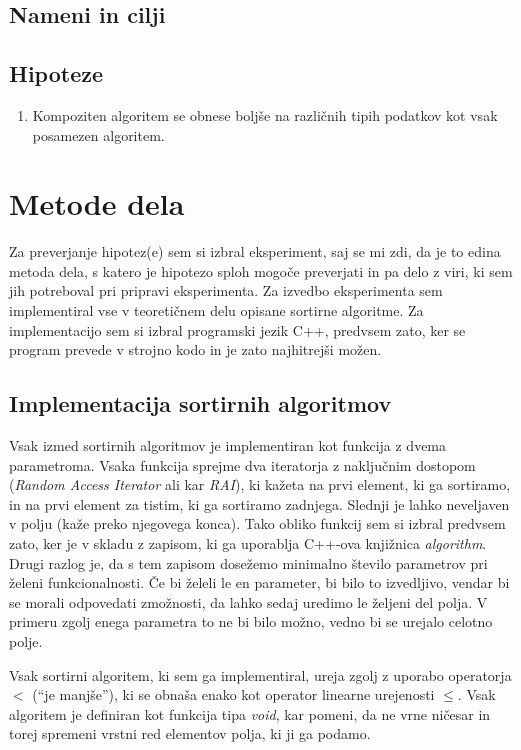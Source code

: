 \documentclass[a4paper,oneside]{article}
\begin{document}
\subsection{Nameni in cilji}
\subsection{Hipoteze}
\begin{enumerate}
  \item Kompoziten algoritem se obnese boljše na različnih tipih podatkov kot vsak
    posamezen algoritem.
\end{enumerate}
\section{Metode dela}
Za preverjanje hipotez(e) sem si izbral eksperiment, saj se mi zdi, da je to edina metoda
dela, s katero je hipotezo sploh mogoče preverjati in pa delo z viri, ki sem jih
potreboval pri pripravi eksperimenta.
Za izvedbo eksperimenta sem implementiral vse v teoretičnem delu opisane sortirne
algoritme. Za implementacijo sem si izbral programski jezik C++, predvsem zato,
ker se program prevede v strojno kodo in je zato najhitrejši možen. 

\subsection{Implementacija sortirnih algoritmov}
\label{chapter:sortimplementation}
Vsak izmed sortirnih algoritmov je implementiran kot funkcija z dvema parametroma.
Vsaka funkcija sprejme dva iteratorja z naključnim dostopom (\emph{Random Access
Iterator} ali kar \emph{RAI}),
ki kažeta na prvi element, ki ga sortiramo, in na prvi element za tistim, ki ga sortiramo
zadnjega. Slednji je lahko neveljaven v polju (kaže preko njegovega konca).
Tako obliko funkcij sem si izbral predvsem zato, ker je v skladu z zapisom, ki ga uporablja
C++-ova knjižnica \emph{algorithm}. Drugi razlog je, da s tem zapisom dosežemo minimalno število
parametrov pri želeni funkcionalnosti. Če bi želeli le en parameter, bi bilo to
izvedljivo, vendar bi se morali odpovedati zmožnosti, da lahko sedaj uredimo le željeni
del polja. V primeru zgolj enega parametra to ne bi bilo možno, vedno bi se
urejalo celotno polje.

Vsak sortirni algoritem, ki sem ga implementiral, ureja zgolj z uporabo operatorja $<$
(``je manjše''), ki se obnaša enako kot operator linearne urejenosti $\leq$. Vsak
algoritem je definiran kot funkcija tipa \emph{void}, kar pomeni, da ne vrne ničesar in
torej spremeni vrstni red elementov polja, ki ji ga podamo.
\end{document}
